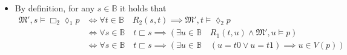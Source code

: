 \documentclass[a4paper, 12pt]{report}
\begin{document}
{\begin{enumerate}[label=(\alph*)]
\begin{itemize}
                        \begin{equation*}
                            \begin{split}
                                \mathfrak M , m \models \Box_2 \lozenge_1 p &\iff \forall n \in \N \quad S_2(m, n) \implies \mathfrak M, n \models \lozenge_2 p \\
                                                                            &\iff \forall n \in \N \quad m > n \implies (\exists k \in \N \quad S_1(n, k) \land \mathfrak M, k \models p) \\
                                                                            &\iff \forall n \in \N \quad m > n \implies (\exists k \in \N \quad k = n + 1 \land k \in V(p)) \\
                                                                            &\iff \forall n \in \N \quad m > n \implies n + 1 \in V(p)
                            \end{split}
                        \end{equation*}
                        Now take $m = 2 \in \N$, and suppose $V(p) = \{m\} = \{2\}$; then $m \in V(p) \iff \mathfrak M, m \models p$, however for instance $n = 0 \in \N$ is such that $m = 2 > 0 = n$ and $n + 1 = 0 + 1 = 1 \notin V(p)$, therefore $\exists n \in \N \quad m > n \land n + 1 \notin V(p) \iff \mathfrak M , m \not\models \Box_2 \lozenge_1 p$, which implies that the formula is not valid on $\mathcal N$.
                    \item By definition, for any $s \in \mathbb B$ it holds that
                        \begin{equation*}
                            \begin{split}
                                \mathfrak M', s \models \Box_2 \lozenge_1 p &\iff \forall t \in \mathbb B \quad R_2(s, t) \implies \mathfrak M', t \models \lozenge_2 p \\
                                                                            &\iff \forall s \in \mathbb B \quad t \sqsubset s \implies (\exists u \in \mathbb B \quad R_1(t, u) \land \mathfrak M', u \models p) \\
                                                                            &\iff \forall s \in \mathbb B \quad t \sqsubset s \implies (\exists u \in \mathbb B \quad (u = t0 \lor u = t1) \implies u \in V(p))
                            \end{split}
                        \end{equation*}

\end{itemize}
\end{enumerate}}
\end{document}
